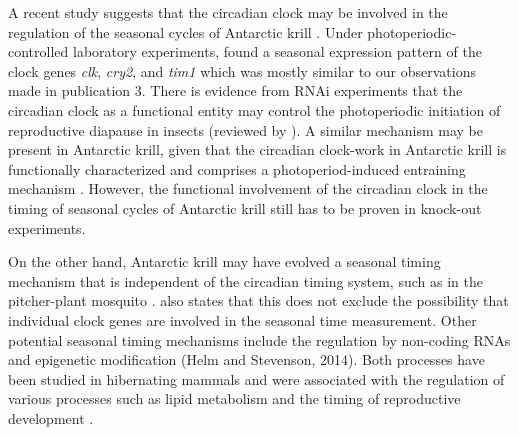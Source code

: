 A recent study suggests that the circadian clock may be involved in the
regulation of the seasonal cycles of Antarctic krill
\citep{piccolin_seasonal_2018}.  Under photoperiodic-controlled laboratory
experiments, \citet{piccolin_seasonal_2018} found a seasonal  expression
pattern of the clock genes \textit{clk}, \textit{cry2}, and \textit{tim1} which
was mostly similar to our observations made in publication 3. There is evidence
from RNAi experiments that the circadian clock as a functional entity may
control the photoperiodic initiation of reproductive diapause in insects
(reviewed by \citet{meuti_evolutionary_2013, meuti_functional_2015}). A similar
mechanism may be present in Antarctic krill, given that the circadian
clock-work in Antarctic krill is functionally characterized and comprises a
photoperiod-induced entraining mechanism \citep{biscontin_functional_2017}.
However, the functional involvement of the circadian clock in the timing of
seasonal cycles of Antarctic krill still has to be proven in knock-out
experiments.

On the other hand, Antarctic krill may have evolved a seasonal timing mechanism
that is independent of the circadian timing system, such as in the
pitcher-plant mosquito \citep{emerson_evolution_2009}.
\citet{emerson_evolution_2009} also states that this does not exclude the
possibility that individual clock genes are involved in the seasonal time
measurement. Other potential seasonal timing mechanisms include the regulation
by non-coding RNAs and epigenetic modification (Helm and Stevenson, 2014). Both
processes have been studied in hibernating mammals and were associated with the
regulation of various processes such as lipid metabolism and the timing of
reproductive development \citep{lang-ouellette_mammalian_2014,
stevenson_epigenetic_2017, stevenson_reversible_2013}.

